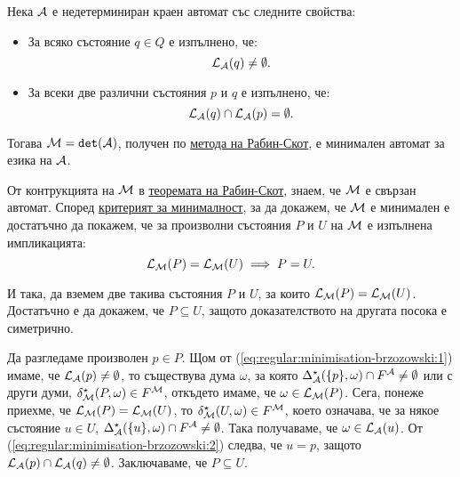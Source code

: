\begin{proposition}
  \label{pr:regular:brzozowski-minimal:det}
  Нека $\mathcal{A}$ е недетерминиран краен автомат със следните свойства:
  \begin{itemize}
  \item
    За всяко състояние $q \in Q$ е изпълнено, че:
    \begin{equation}
      \label{eq:regular:minimisation-brzozowski:1}      
      \mathcal{L}_{\mathcal{A}}(q) \neq \emptyset.
    \end{equation}
  \item
    За всеки две различни състояния $p$ и $q$ е изпълнено, че:
    \begin{equation}
      \label{eq:regular:minimisation-brzozowski:2}
      \mathcal{L}_{\mathcal{A}}(q) \cap \mathcal{L}_{\mathcal{A}}(p) = \emptyset.
    \end{equation}
  \end{itemize}
  Тогава $\mathcal{M} = \texttt{det}(\mathcal{A})$, получен по \hyperref[th:regular:nfa:construction]{метода на Рабин-Скот}, е минимален автомат за езика на $\mathcal{A}$.
\end{proposition}
\begin{hint}
  От контрукцията на $\mathcal{M}$ в \hyperref[th:regular:nfa:construction]{теоремата на Рабин-Скот}, знаем, че $\mathcal{M}$ е свързан автомат.
  Според \hyperref[cr:regular:brzozowski-minimal:criterion]{критерият за минималност}, за да докажем, че $\mathcal{M}$ е минимален е достатъчно да
  покажем, че за произволни състояния $P$ и $U$ на $\mathcal{M}$ е изпълнена импликацията:
  \[\mathcal{L}_{\mathcal{M}}(P) = \mathcal{L}_{\mathcal{M}}(U) \implies P = U.\]

  И така, да вземем две такива състояния $P$ и $U$, за които $\mathcal{L}_{\mathcal{M}}(P) = \mathcal{L}_{\mathcal{M}}(U)$.
  Достатъчно е да докажем, че $P \subseteq U$, защото доказателството на другата посока е симетрично.

  Да разгледаме произволен $p \in P$. Щом от (\ref{eq:regular:minimisation-brzozowski:1}) имаме, че $\mathcal{L}_{\mathcal{A}}(p) \neq \emptyset$, то съществува дума $\omega$,
  за която $\Delta^\star_{\mathcal{A}}(\{p\},\omega) \cap F^{\mathcal{A}} \neq \emptyset$
  или с други думи,
  $\delta^\star_{\mathcal{M}}(P,\omega) \in F^{\mathcal{M}}$, откъдето имаме, че $\omega \in \mathcal{L}_{\mathcal{M}}(P)$.
  Сега, понеже приехме, че $\mathcal{L}_{\mathcal{M}}(P) = \mathcal{L}_{\mathcal{M}}(U)$, то $\delta^\star_{\mathcal{M}}(U,\omega) \in F^{\mathcal{M}}$,
  което означава, че за някое състояние $u \in U$, $\Delta^\star_{\mathcal{A}}(\{u\},\omega) \cap F^{\mathcal{A}} \neq \emptyset$.
  Така получаваме, че $\omega \in \mathcal{L}_{\mathcal{A}}(u)$. От (\ref{eq:regular:minimisation-brzozowski:2}) следва, че
  $u = p$, защото $\mathcal{L}_{\mathcal{A}}(p) \cap \mathcal{L}_{\mathcal{A}}(q) \neq \emptyset$. Заключаваме, че $P \subseteq U$.
\end{hint}


